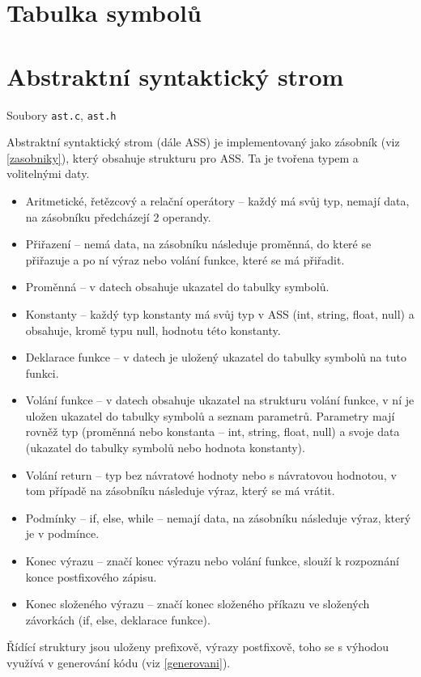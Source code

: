 \documentclass[a4paper, 12pt]{article}
\begin{document}
    \section{Tabulka symbolů}

    \section{Abstraktní syntaktický strom}
    Soubory \texttt{ast.c}, \texttt{ast.h}
    
    Abstraktní syntaktický strom (dále ASS) je implementovaný jako zásobník (viz \ref{zasobniky}), který obsahuje strukturu pro ASS. Ta je tvořena typem a volitelnými daty.
    \begin{itemize}
        \item Aritmetické, řetězcový a relační operátory -- každý má svůj typ, nemají data, na zásobníku předcházejí 2 operandy.
        \item Přiřazení -- nemá data, na zásobníku následuje proměnná, do které se přiřazuje a po ní výraz nebo volání funkce, které se má přiřadit.
        \item Proměnná -- v datech obsahuje ukazatel do tabulky symbolů.
        \item Konstanty -- každý typ konstanty má svůj typ v ASS (int, string, float, null) a obsahuje, kromě typu null, hodnotu této konstanty.
        \item Deklarace funkce -- v datech je uložený ukazatel do tabulky symbolů na tuto funkci.
        \item Volání funkce -- v datech obsahuje ukazatel na strukturu volání funkce, v ní je uložen ukazatel do tabulky symbolů a seznam parametrů. Parametry mají rovněž typ (proměnná nebo konstanta -- int, string, float, null) a svoje data (ukazatel do tabulky symbolů nebo hodnota konstanty).
        \item Volání return -- typ bez návratové hodnoty nebo s návratovou hodnotou, v tom případě na zásobníku následuje výraz, který se má vrátit.
        \item Podmínky -- if, else, while -- nemají data, na zásobníku následuje výraz, který je v podmínce.
        \item Konec výrazu -- značí konec výrazu nebo volání funkce, slouží k rozpoznání konce postfixového zápisu.
        \item Konec složeného výrazu -- značí konec složeného příkazu ve složených závorkách (if, else, deklarace funkce).
    \end{itemize}
    Řídící struktury jsou uloženy prefixově, výrazy postfixově, toho se s výhodou využívá v generování kódu (viz \ref{generovani}).
\end{document}
